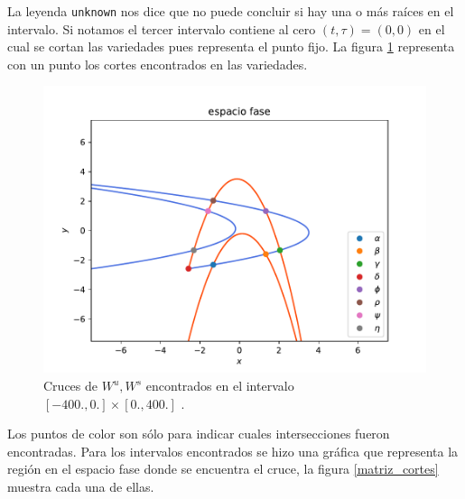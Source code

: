 La leyenda \texttt{unknown} nos dice que no puede concluir si hay una o más raíces en el intervalo. Si notamos el tercer intervalo contiene al cero $(t,\tau)=(0,0)$ en el cual se cortan las variedades pues representa el punto fijo. La figura \ref{crucesH} representa con un punto los cortes encontrados en las variedades.
\begin{figure}[H]
\centering
\includegraphics[scale=0.5]{crucesL}
\caption{Cruces de $W^{u},W^{s}$ encontrados en el intervalo $[-400.,0.] \times [0.,400.]$ .}
\label{crucesH}
\end{figure}
Los puntos de color son sólo para indicar cuales intersecciones fueron encontradas. Para los intervalos encontrados se hizo una gráfica que representa la región en el espacio fase donde se encuentra el cruce, la figura \ref{matriz_cortes} muestra cada una de ellas.

